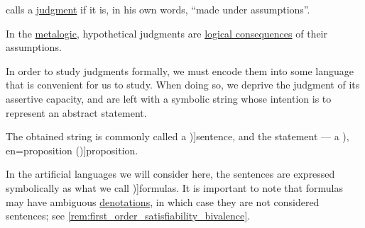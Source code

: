 \begin{concept}\label{con:hypothetical_judgment}
   calls a \hyperref[con:judgment]{judgment}  if it is, in his own words, \enquote{made under assumptions}.
\end{concept}
\begin{comments}
  \item In the \hyperref[con:metalogic]{metalogic}, hypothetical judgments are \hyperref[def:consequence_relation]{logical consequences} of their assumptions.
\end{comments}

\begin{concept}\label{con:proposition}
  In order to study judgments formally, we must encode them into some language that is convenient for us to study. When doing so, we deprive the judgment of its assertive capacity, and are left with a symbolic string whose intention is to represent an abstract statement.

  The obtained string is commonly called a \term[en=sentence (\cite[4]{Kleene2002Logic})]{sentence}, and the statement --- a \term[ru=высказывание (\cite[8]{Эдельман1975Логика}), en=proposition (\cite[4]{Kleene2002Logic})]{proposition}.

  In the artificial languages we will consider here, the sentences are expressed symbolically as what we call \term[en=formula (\cite[4]{Kleene2002Logic})]{formulas}. It is important to note that formulas may have ambiguous \hyperref[con:denotation]{denotations}, in which case they are not considered sentences; see \cref{rem:first_order_satisfiability_bivalence}.
\end{concept}
